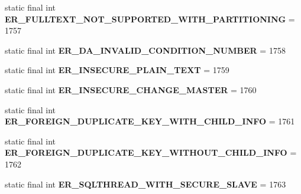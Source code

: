 \begin{DoxyCompactItemize}
static final int {\bfseries E\+R\+\_\+\+F\+U\+L\+L\+T\+E\+X\+T\+\_\+\+N\+O\+T\+\_\+\+S\+U\+P\+P\+O\+R\+T\+E\+D\+\_\+\+W\+I\+T\+H\+\_\+\+P\+A\+R\+T\+I\+T\+I\+O\+N\+I\+NG} = 1757
\item 
\mbox{\label{classcom_1_1mysql_1_1jdbc_1_1_mysql_error_numbers_ae7d8bc73991f3dca53bcc3eb6f4bb430}} 
static final int {\bfseries E\+R\+\_\+\+D\+A\+\_\+\+I\+N\+V\+A\+L\+I\+D\+\_\+\+C\+O\+N\+D\+I\+T\+I\+O\+N\+\_\+\+N\+U\+M\+B\+ER} = 1758
\item 
\mbox{\label{classcom_1_1mysql_1_1jdbc_1_1_mysql_error_numbers_a0b89d8478a4f5a8aeaff8cc65b40d200}} 
static final int {\bfseries E\+R\+\_\+\+I\+N\+S\+E\+C\+U\+R\+E\+\_\+\+P\+L\+A\+I\+N\+\_\+\+T\+E\+XT} = 1759
\item 
\mbox{\label{classcom_1_1mysql_1_1jdbc_1_1_mysql_error_numbers_a232e578882df6a85305aea3af51b2ede}} 
static final int {\bfseries E\+R\+\_\+\+I\+N\+S\+E\+C\+U\+R\+E\+\_\+\+C\+H\+A\+N\+G\+E\+\_\+\+M\+A\+S\+T\+ER} = 1760
\item 
\mbox{\label{classcom_1_1mysql_1_1jdbc_1_1_mysql_error_numbers_af8ff341161efb10572ba1fb0efecbc89}} 
static final int {\bfseries E\+R\+\_\+\+F\+O\+R\+E\+I\+G\+N\+\_\+\+D\+U\+P\+L\+I\+C\+A\+T\+E\+\_\+\+K\+E\+Y\+\_\+\+W\+I\+T\+H\+\_\+\+C\+H\+I\+L\+D\+\_\+\+I\+N\+FO} = 1761
\item 
\mbox{\label{classcom_1_1mysql_1_1jdbc_1_1_mysql_error_numbers_a89cbbdac77651c898db4421d0b647899}} 
static final int {\bfseries E\+R\+\_\+\+F\+O\+R\+E\+I\+G\+N\+\_\+\+D\+U\+P\+L\+I\+C\+A\+T\+E\+\_\+\+K\+E\+Y\+\_\+\+W\+I\+T\+H\+O\+U\+T\+\_\+\+C\+H\+I\+L\+D\+\_\+\+I\+N\+FO} = 1762
\item 
\mbox{\label{classcom_1_1mysql_1_1jdbc_1_1_mysql_error_numbers_ad217c20195edd3a92bcb19d83e1a084f}} 
static final int {\bfseries E\+R\+\_\+\+S\+Q\+L\+T\+H\+R\+E\+A\+D\+\_\+\+W\+I\+T\+H\+\_\+\+S\+E\+C\+U\+R\+E\+\_\+\+S\+L\+A\+VE} = 1763
\item 
\mbox{\label{classcom_1_1mysql_1_1jdbc_1_1_mysql_error_numbers_a927a4a6e4946d992147406a73adfc563}} 

\end{DoxyCompactItemize}
